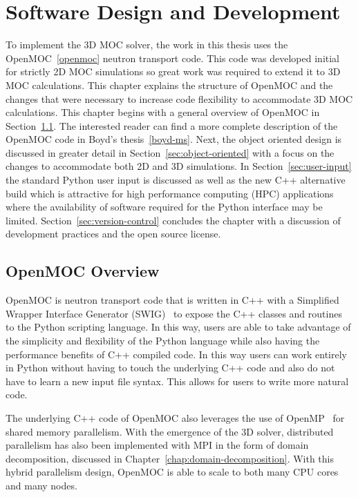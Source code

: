 \chapter{Software Design and Development}
\label{chap:software-design}

To implement the 3D MOC solver, the work in this thesis uses the OpenMOC~\ref{openmoc} neutron transport code. This code was developed initial for strictly 2D MOC simulations so great work was required to extend it to 3D MOC calculations. This chapter explains the structure of OpenMOC and the changes that were necessary to increase code flexibility to accommodate 3D MOC calculations. This chapter begins with a general overview of OpenMOC in Section~\ref{sec:openmoc-overview}. The interested reader can find a more complete description of the OpenMOC code in Boyd's thesis~\ref{boyd-ms}. Next, the object oriented design is discussed in greater detail in Section~\ref{sec:object-oriented} with a focus on the changes to accommodate both 2D and 3D simulations. In Section~\ref{sec:user-input} the standard Python user input is discussed as well as the new C++ alternative build which is attractive for high performance computing (HPC) applications where the availability of software required for the Python interface may be limited. Section~\ref{sec:version-control} concludes the chapter with a discussion of development practices and the open source license.

\section{OpenMOC Overview}
\label{sec:openmoc-overview}

OpenMOC is neutron transport code that is written in C++ with a Simplified Wrapper Interface Generator (SWIG)~\cite{swig} to expose the C++ classes and routines to the Python scripting language. In this way, users are able to take advantage of the simplicity and flexibility of the Python language while also having the performance benefits of C++ compiled code. In this way users can work entirely in Python without having to touch the underlying C++ code and also do not have to learn a new input file syntax. This allows for users to write more natural code.

The underlying C++ code of OpenMOC also leverages the use of OpenMP~\cite{openmp} for shared memory parallelism. With the emergence of the 3D solver, distributed parallelism has also been implemented with MPI in the form of domain decomposition, discussed in Chapter~\ref{chap:domain-decomposition}. With this hybrid parallelism design, OpenMOC is able to scale to both many CPU cores and many nodes. 

